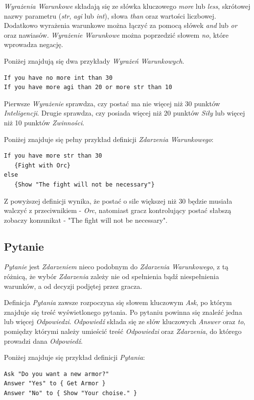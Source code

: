 \documentclass[openright]{xmgr}
\begin{document}
\textit{Wyrażenia Warunkowe} składają się ze słówka kluczowego \textit{more} lub \textit{less}, skrótowej nazwy parametru (\textit{str}, \textit{agi} lub \textit{int}), słowa \textit{than} oraz wartości liczbowej. Dodatkowo wyrażenia warunkowe można łączyć za pomocą słówek \textit{and} lub \textit{or} oraz nawiasów. \textit{Wyrażenie Warunkowe} można poprzedzić słowem \textit{no}, które wprowadza negację.

Poniżej znajdują się dwa przykłady \textit{Wyrażeń Warunkowych}.
\begin{verbatim}
If you have no more int than 30
If you have more agi than 20 or more str than 10
\end{verbatim}

Pierwsze \textit{Wyrażenie} sprawdza, czy postać ma nie więcej niż 30 punktów \textit{Inteligencji}. Drugie sprawdza, czy posiada więcej niż 20 punktów \textit{Siły} lub więcej niż 10 punktów \textit{Zwinności}.

Poniżej znajduje się pełny przykład definicji \textit{Zdarzenia Warunkowego}: 
\begin{verbatim}
If you have more str than 30 
   {Fight with Orc}
else 
   {Show "The fight will not be necessary"}
\end{verbatim}

Z powyższej definicji wynika, że postać o sile większej niż 30 będzie musiała walczyć z przeciwnikiem - \textit{Orc}, natomiast gracz kontrolujący postać słabszą zobaczy komunikat - "The fight will not be necessary".

\subsection*{Pytanie}
\textit{Pytanie} jest \textit{Zdarzeniem} nieco podobnym do \textit{Zdarzenia Warunkowego}, z tą różnicą, że wybór \textit{Zdarzenia} zależy nie od spełnienia bądź niespełnienia warunków, a od decyzji podjętej przez gracza.

Definicja \textit{Pytania} zawsze rozpoczyna się słowem kluczowym \textit{Ask}, po którym znajduje się treść wyświetlonego pytania. Po pytaniu powinna się znaleźć jedna lub więcej \textit{Odpowiedzi}. \textit{Odpowiedź} składa się ze słów kluczowych \textit{Answer} oraz \textit{to}, pomiędzy którymi należy umieścić treść \textit{Odpowiedzi} oraz \textit{Zdarzenia}, do którego prowadzi dana \textit{Odpowiedź}. 

Poniżej znajduje się przykład definicji \textit{Pytania}:
\begin{verbatim}
Ask "Do you want a new armor?"
Answer "Yes" to { Get Armor }
Answer "No" to { Show "Your choise." }
\end{verbatim}
\end{document}
